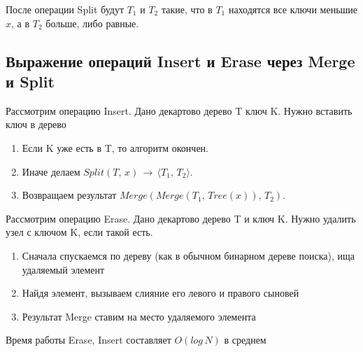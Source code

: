После операции Split будут $T_1$ и $T_2$ такие, что в $T_1$ находятся все ключи меньшие $x$, а в $T_2$ больше, либо равные.

\subsection*{Выражение операций Insert и Erase через Merge и Split}

Рассмотрим операцию Insert. Дано декартово дерево T ключ K. Нужно вставить ключ в дерево

\begin{enumerate}
    \item Если K уже есть в T, то алгоритм окончен.
    \item Иначе делаем $Split(T,\,x)\,\rightarrow \, \langle T_1,\,T_2\rangle$.
    \item Возвращаем результат $Merge(Merge(T_1,\,Tree(x)),\,T_2)$.
\end{enumerate}

Рассмотрим операцию Erase. Дано декартово дерево T и ключ K. Нужно удалить узел с ключом K, если такой есть.

\begin{enumerate}
    \item Сначала спускаемся по дереву (как в обычном бинарном дереве поиска), ища удаляемый элемент
    \item Найдя элемент, вызываем слияние его левого и правого сыновей
    \item Результат Merge ставим на место удаляемого элемента
\end{enumerate}

\Statement Время работы Erase, Insert составляет $O(log\,N)$ в среднем

\pagebreak